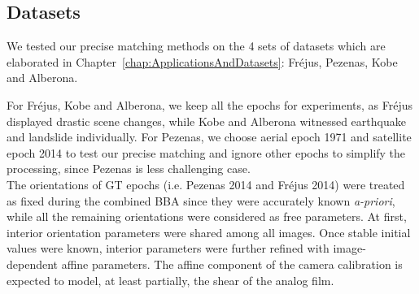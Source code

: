 \subsection{Datasets}
We tested our precise matching methods on the 4 sets of datasets which are elaborated in Chapter~\ref{chap:ApplicationsAndDatasets}: Fr{\'e}jus, Pezenas, Kobe and Alberona.

For Fr{\'e}jus, Kobe and Alberona, we keep all the epochs for experiments, as Fr{\'e}jus displayed drastic scene changes, while Kobe and Alberona witnessed earthquake and landslide individually. For Pezenas, we choose aerial epoch 1971 and satellite epoch 2014 to test our precise matching and ignore other epochs to simplify the processing, since Pezenas is less challenging case.\\
The orientations of \ac{GT} epochs (i.e. Pezenas 2014 and Fr{\'e}jus 2014) were treated as fixed during the combined \ac{BBA} since they were accurately known \textit{a-priori}, while all the remaining orientations were considered as free parameters. At first, {interior orientation parameters} were shared among all images. Once stable initial values were known, interior parameters were further refined with image-dependent affine parameters. The affine component of the camera calibration is expected to model, at least partially, the shear of the analog film.\\
